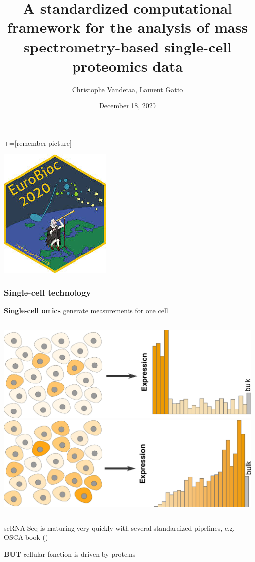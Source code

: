 \documentclass{beamer}
\title{A standardized computational framework for the analysis of mass 
spectrometry-based single-cell proteomics data}
\author[]{Christophe Vanderaa, Laurent Gatto}
\date{December 18, 2020}
\begin{document}
+=[remember picture]

\begin{frame}[plain]
\titlepage
\centering
\includegraphics[width=0.15\linewidth]{figs/eurobioc2020.jpg}
\end{frame}

\begin{frame}[c]
  \frametitle{Single-cell technology}
  
  \textbf{Single-cell omics} generate measurements for one cell
  
  \vfill
  \begin{columns}
    \includegraphics[width=\linewidth]{figs/bulk_issue1.pdf}
    \includegraphics[width=\linewidth]{figs/bulk_issue2.pdf}
  \end{columns}
  
  \vfill
  scRNA-Seq is maturing very quickly with several standardized 
  pipelines, e.g. OSCA book (\cite{Amezquita2019-bf})
  
  \vfill
  \textbf{BUT} cellular fonction is driven by proteins
  
\end{frame}
\end{document}
